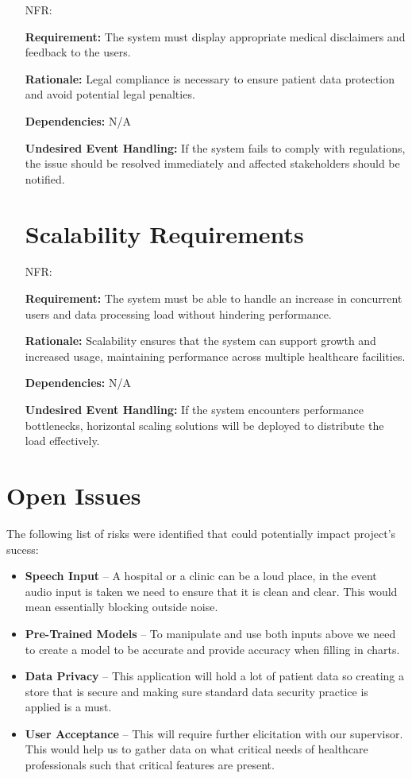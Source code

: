\documentclass[12pt]{article}
\newcounter{nfrnum} %
\begin{document}
\begin{itemize}
\item[NFR\refstepcounter{nfrnum}\thenfrnum \label{NFR_Legal}:] 

\textbf{Requirement:} The system must display appropriate medical disclaimers and feedback to the users.

\textbf{Rationale:} Legal compliance is necessary to ensure patient data protection and avoid potential legal penalties.

\textbf{Dependencies:} N/A

\textbf{Undesired Event Handling:} If the system fails to comply with regulations, the issue should be resolved immediately and affected stakeholders should be notified.

\section{Scalability Requirements}

\item[NFR\refstepcounter{nfrnum}\thenfrnum \label{NFR_Scalability}:]

\textbf{Requirement:} The system must be able to handle an increase in concurrent users and data processing load without hindering performance.

\textbf{Rationale:} Scalability ensures that the system can support growth and increased usage, maintaining performance across multiple healthcare facilities.  

\textbf{Dependencies:} N/A

\textbf{Undesired Event Handling:} If the system encounters performance bottlenecks, horizontal scaling solutions will be deployed to distribute the load effectively.

\end{itemize}


\section{Open Issues}

The following list of risks were identified that could potentially impact project's sucess:
\begin{itemize}
  \item \textbf{Speech Input} -- A hospital or a clinic can be a loud place, in the event audio input is taken we need to ensure that it is clean and clear. This would mean essentially blocking outside noise. 
  \item \textbf{Pre-Trained Models} -- To manipulate and use both inputs above we need to create a model to be accurate and provide accuracy when filling in charts. 
  \item \textbf{Data Privacy} -- This application will hold a lot of patient data so creating a store that is secure and making sure standard data security practice is applied is a must.
  \item \textbf{User Acceptance} -- This will require further elicitation with our supervisor. This would help us to gather data on what critical needs of healthcare professionals such that critical features are present. 
\end{itemize}
\end{document}

